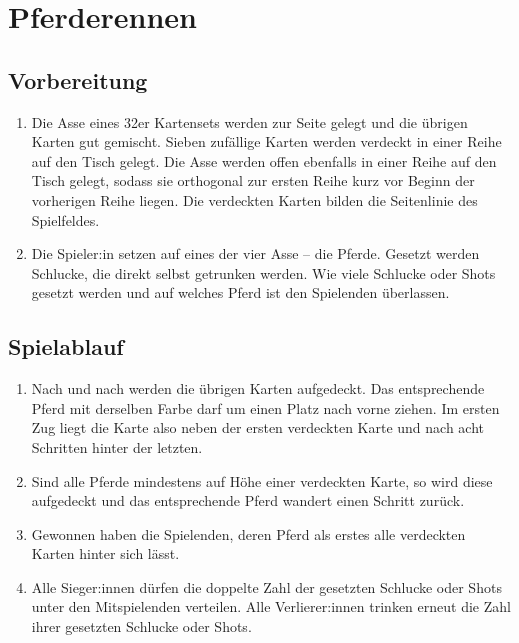 \chapter{Pferderennen}
\section{Vorbereitung}
\begin{enumerate}[label={(\arabic*)}]    
    \item
    Die Asse eines 32er Kartensets werden zur Seite gelegt und die übrigen Karten gut gemischt.
    Sieben zufällige Karten werden verdeckt in einer Reihe auf den Tisch gelegt.
    Die Asse werden offen ebenfalls in einer Reihe auf den Tisch gelegt, sodass sie orthogonal zur ersten Reihe kurz vor Beginn der vorherigen Reihe liegen.
    Die verdeckten Karten bilden die Seitenlinie des Spielfeldes.

    \item
    Die Spieler:in setzen auf eines der vier Asse – die \glqq{}Pferde\grqq{}.
    Gesetzt werden Schlucke, die direkt selbst getrunken werden.
    Wie viele Schlucke oder Shots gesetzt werden und auf welches Pferd ist den Spielenden überlassen.
\end{enumerate}

\section{Spielablauf}
\begin{enumerate}[label={(\arabic*)}]
    \item
    Nach und nach werden die übrigen Karten aufgedeckt.
    Das entsprechende Pferd mit derselben Farbe darf um einen Platz nach vorne ziehen.
    Im ersten Zug liegt die Karte also neben der ersten verdeckten Karte und nach acht Schritten hinter der letzten.

    \item
    Sind alle Pferde mindestens auf Höhe einer verdeckten Karte, so wird diese aufgedeckt und das entsprechende Pferd wandert einen Schritt zurück.

    \item
    Gewonnen haben die Spielenden, deren Pferd als erstes alle verdeckten Karten hinter sich lässt.

    \item
    Alle Sieger:innen dürfen die doppelte Zahl der gesetzten Schlucke oder Shots unter den Mitspielenden verteilen.
    Alle Verlierer:innen trinken erneut die Zahl ihrer gesetzten Schlucke oder Shots.
\end{enumerate}
